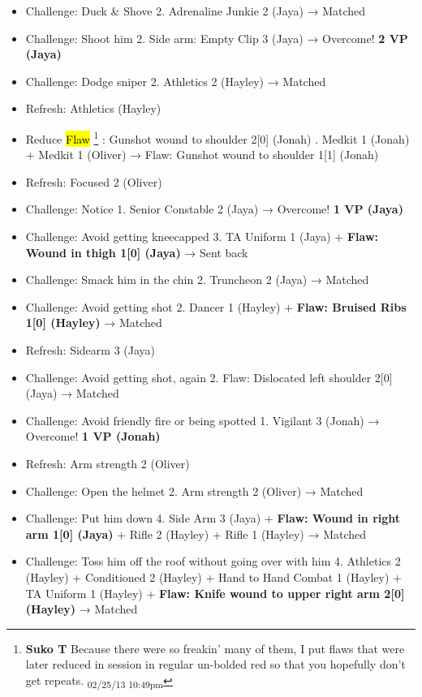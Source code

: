 \begin{itemize}
\item Challenge: Duck \& Shove 2.  Adrenaline Junkie 2 (Jaya) →  Matched
\item Challenge: Shoot him 2.  Side arm: Empty Clip 3 (Jaya) → Overcome! \textbf{2 VP (Jaya)}
\item Challenge: Dodge sniper 2.  Athletics 2 (Hayley) → Matched
\item Refresh: Athletics (Hayley)
\item  {\color[RGB]{255,0,0}Reduce}  {\color[RGB]{255,0,0}\hl{Flaw}} \footnote{\textbf{Suko T }Because there were so freakin' many of them, I put flaws that were later reduced in session in regular un-bolded red so that you hopefully don't get repeats. \textsubscript{02/25/13 10:49pm}} {\color[RGB]{255,0,0}: Gunshot wound to shoulder 2{[}0{]} (Jonah)} .  Medkit 1 (Jonah) + Medkit 1 (Oliver) →  {\color[RGB]{255,0,0}Flaw: Gunshot wound to shoulder 1{[}1{]} (Jonah)} 
\item Refresh: Focused 2 (Oliver)
\item Challenge: Notice 1. Senior Constable 2 (Jaya) → Overcome! \textbf{1 VP (Jaya)}
\item Challenge: Avoid getting kneecapped 3.  TA Uniform 1 (Jaya) + \textbf{ {\color[RGB]{255,0,0}Flaw: Wound in thigh 1{[}0{]} (Jaya)} } → Sent back
\item Challenge: Smack him in the chin 2.  Truncheon 2 (Jaya) → Matched
\item Challenge: Avoid getting shot 2.  Dancer 1 (Hayley) + \textbf{ {\color[RGB]{255,0,0}Flaw: Bruised Ribs 1{[}0{]} (Hayley)} } → Matched
\item Refresh: Sidearm 3 (Jaya)
\item Challenge: Avoid getting shot, again 2.   {\color[RGB]{255,0,0}Flaw: Dislocated left shoulder 2{[}0{]} (Jaya)}  → Matched
\item Challenge: Avoid friendly fire or being spotted 1.  Vigilant 3 (Jonah) → Overcome! \textbf{1 VP (Jonah)}
\item Refresh: Arm strength 2 (Oliver)
\item Challenge: Open the helmet 2.  Arm strength 2 (Oliver) → Matched
\item Challenge: Put him down 4.  Side Arm 3 (Jaya) + \textbf{ {\color[RGB]{255,0,0}Flaw: Wound in right arm 1{[}0{]} (Jaya)} } + Rifle 2 (Hayley) + Rifle 1 (Hayley) → Matched
\item Challenge: Toss him off the roof without going over with him 4. Athletics 2 (Hayley) + Conditioned 2 (Hayley) + Hand to Hand Combat 1 (Hayley) + TA Uniform 1 (Hayley) + \textbf{ {\color[RGB]{255,0,0}Flaw: Knife wound to upper right arm 2{[}0{]} (Hayley)} } → Matched

\end{itemize}
